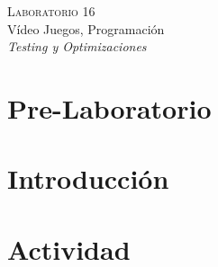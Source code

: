 \begin{center}
\textsc{\Large Laboratorio 16}~\\
{\large Vídeo Juegos, Programación}~\\
\emph{Testing y Optimizaciones}
\end{center}

\section{Pre-Laboratorio}

\section{Introducción}


\section{Actividad}
